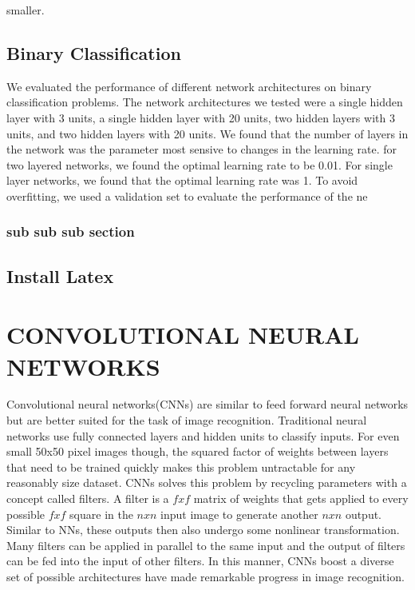 \documentclass[10pt,twoside]{article}
\begin{document}
\noindent smaller.

\subsection{Binary Classification}

We evaluated the performance of different network architectures on binary classification problems. The network architectures we tested were a single hidden layer with 3 units, a single hidden layer with 20 units, two hidden layers with 3 units, and two hidden layers with 20 units. We found that the number of layers in the network was the parameter most sensive to changes in the learning rate. for two layered networks, we found the optimal learning rate to be 0.01. For single layer networks, 
we found that the optimal learning rate was 1. To avoid overfitting, we used a validation set to evaluate the performance of the ne

\subsubsection{sub sub sub section}


\subsection{Install Latex}


\section{\uppercase{Convolutional Neural Networks}}

\noindent Convolutional neural networks(CNNs) are similar to feed forward neural networks but are better suited for the task of image recognition. Traditional neural networks use fully connected layers and hidden units to classify inputs. For even small 50x50 pixel images though, the squared factor of weights between layers that need to be trained quickly makes this problem untractable for any reasonably size dataset.  CNNs solves this problem by recycling parameters with a concept called filters. A filter is a $fxf$ matrix of weights that gets applied to every possible $fxf$ square in the $nxn$ input image to generate another $nxn$ output. Similar to NNs, these outputs then also undergo some nonlinear transformation. Many filters can be applied in parallel to the same input and the output of filters can be fed into the input of other filters. In this manner, CNNs boost a diverse set of possible architectures have made remarkable progress in image recognition.
\end{document}
